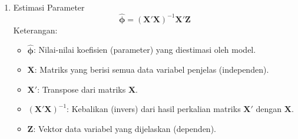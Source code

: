 \begin{enumerate}
\begin{enumerate}[label=\alph*)]
\begin{enumerate}[label=\roman*)]
            Kemudian dilakukan penurunan terhadap semua parameter, selanjutnya dibentuk matriks dengan memilih
            \begin{equation}\label{st_ar_matriks}
                \hat{\boldsymbol{\phi}} =
                \begin{bmatrix}
                \phi_{10} \\
                \phi_{11} \\
                \phi_{12} \\
                \vdots \\
                \phi_{p\lambda}
                \end{bmatrix}
                \quad \text{dan} \quad
                \mathbf{X} = 
                \left[
                \mathbf{Z}_{t-1} \quad
                W \mathbf{Z}_{t-1} \quad
                W^2 \mathbf{Z}_{t-1} \quad
                \cdots \quad
                W^{\lambda} \mathbf{Z}_{t-p}
                \right]
            \end{equation}

            \item Estimasi Parameter
            \begin{equation}\label{st_ar_parameter}
                \hat{\boldsymbol{\phi}} = \left( \mathbf{X}' \mathbf{X} \right)^{-1} \mathbf{X}' \mathbf{Z}
            \end{equation}
            Keterangan:
            \begin{itemize}
                \item $\hat{\boldsymbol{\phi}}$: Nilai-nilai koefisien (parameter) yang diestimasi oleh model.
                \item $\mathbf{X}$: Matriks yang berisi semua data variabel penjelas (independen).
                \item $\mathbf{X}'$: Transpose dari matriks $\mathbf{X}$.
                \item $(\mathbf{X}' \mathbf{X})^{-1}$: Kebalikan (invers) dari hasil perkalian matriks $\mathbf{X}'$ dengan $\mathbf{X}$.
                \item $\mathbf{Z}$: Vektor data variabel yang dijelaskan (dependen).
            \end{itemize}


\end{enumerate}
\end{enumerate}
\end{enumerate}

